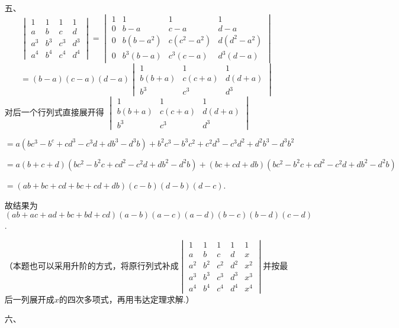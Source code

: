 \begin{enumerate}
\begin{enumerate}
    \end{enumerate}
    \item[五、]
    \[
    \begin{vmatrix}
    1 & 1 & 1 & 1 \\
    a & b & c & d \\
    a^3 & b^3 & c^3 & d^3 \\
    a^4 & b^4 & c^4 & d^4
    \end{vmatrix}
    =
    \begin{vmatrix}
    1 & 1 & 1 & 1 \\
    0 & b - a & c - a & d - a \\
    0 & b(b - a^2) & c(c^2 - a^2) & d(d^2 - a^2) \\
    0 & b^3(b - a) & c^3(c - a) & d^3(d - a)
    \end{vmatrix}\]
    \[
    =(b - a)(c - a)(d - a)
    \begin{vmatrix}
    1 & 1 & 1 \\
    b(b + a) & c(c + a) & d(d + a) \\
    b^3 & c^3 & d^3
    \end{vmatrix}
    \]
    对后一个行列式直接展开得 \(
        \begin{vmatrix}
        1 & 1 & 1 \\
        b(b + a) & c(c + a) & d(d + a) \\
        b^3 & c^3 & d^3
        \end{vmatrix}\)\par
    \(=a(bc^3-b^c+cd^3-c^3d+db^3-d^3b)+b^2c^3-b^3c^2+c^2d^3-c^3d^2+d^2b^3-d^3b^2\)\par
    \(=a(b+c+d)(bc^2-b^2c+cd^2-c^2d+db^2-d^2b)+(bc+cd+db)(bc^2-b^2c+cd^2-c^2d+db^2-d^2b)\)\par
    \(=(ab+bc+cd+bc+cd+db)(c-b)(d-b)(d-c)\).\par
    故结果为 \((ab+ac+ad+bc+bd+cd)(a-b)(a-c)(a-d)(b-c)(b-d)(c-d)\).\par
    （本题也可以采用升阶的方式，将原行列式补成\(
        \begin{vmatrix}
            1 & 1 & 1 & 1 & 1 \\
            a & b & c & d & x \\
            a^2 & b^2 & c^2 & d^2 & x^2 \\
            a^3 & b^3 & c^3 & d^3 & x^3 \\
            a^4 & b^4 & c^4 & d^4 & x^4
            \end{vmatrix}
    \)并按最后一列展开成\(x\)的四次多项式，再用韦达定理求解.）
    \item[六、]

\end{enumerate}

